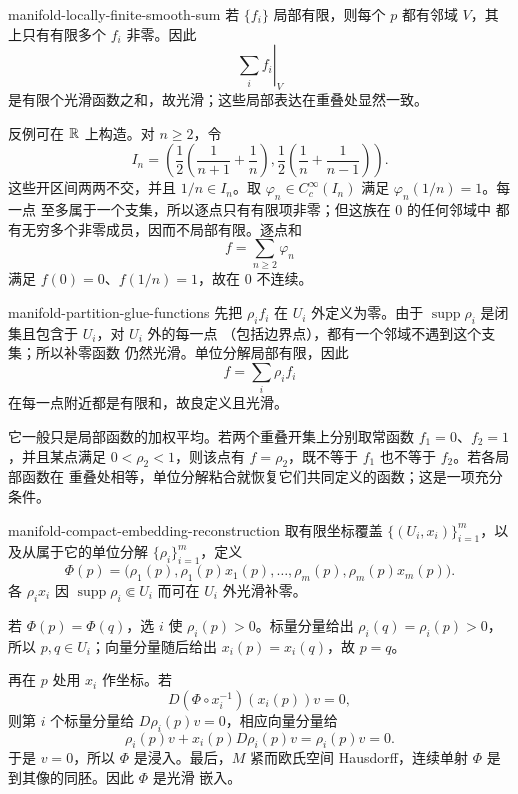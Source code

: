 \begin{solution}{manifold-locally-finite-smooth-sum}
若 \(\{f_i\}\) 局部有限，则每个 \(p\) 都有邻域 \(V\)，其上只有有限多个
\(f_i\) 非零。因此
\[
 \left.\sum_i f_i\right|_V
\]
是有限个光滑函数之和，故光滑；这些局部表达在重叠处显然一致。

反例可在 \(\mathbb{R}\) 上构造。对 \(n\ge2\)，令
\[
 I_n=
 \left(
 \frac12\left(\frac1{n+1}+\frac1n\right),
 \frac12\left(\frac1n+\frac1{n-1}\right)
 \right).
\]
这些开区间两两不交，并且 \(1/n\in I_n\)。取
\(\varphi_n\in C_c^\infty(I_n)\) 满足 \(\varphi_n(1/n)=1\)。每一点
至多属于一个支集，所以逐点只有有限项非零；但这族在 \(0\) 的任何邻域中
都有无穷多个非零成员，因而不局部有限。逐点和
\[
 f=\sum_{n\ge2}\varphi_n
\]
满足 \(f(0)=0\)、\(f(1/n)=1\)，故在 \(0\) 不连续。
\end{solution}

\begin{solution}{manifold-partition-glue-functions}
先把 \(\rho_i f_i\) 在 \(U_i\) 外定义为零。由于
\(\operatorname{supp}\rho_i\) 是闭集且包含于 $U_i$，对 $U_i$ 外的每一点
（包括边界点），都有一个邻域不遇到这个支集；所以补零函数
仍然光滑。单位分解局部有限，因此
\[
 f=\sum_i\rho_i f_i
\]
在每一点附近都是有限和，故良定义且光滑。

它一般只是局部函数的加权平均。若两个重叠开集上分别取常函数
\(f_1=0\)、\(f_2=1\)，并且某点满足 \(0<\rho_2<1\)，则该点有
\(f=\rho_2\)，既不等于 \(f_1\) 也不等于 \(f_2\)。若各局部函数在
重叠处相等，单位分解粘合就恢复它们共同定义的函数；这是一项充分条件。
\end{solution}

\begin{solution}{manifold-compact-embedding-reconstruction}
取有限坐标覆盖 \(\{(U_i,x_i)\}_{i=1}^m\)，以及从属于它的单位分解
\(\{\rho_i\}_{i=1}^m\)，定义
\[
 \Phi(p)=
 \bigl(\rho_1(p),\rho_1(p)x_1(p),\ldots,
       \rho_m(p),\rho_m(p)x_m(p)\bigr).
\]
各 \(\rho_i x_i\) 因 \(\operatorname{supp}\rho_i\Subset U_i\) 而可在
\(U_i\) 外光滑补零。

若 \(\Phi(p)=\Phi(q)\)，选 \(i\) 使 \(\rho_i(p)>0\)。标量分量给出
\(\rho_i(q)=\rho_i(p)>0\)，所以 \(p,q\in U_i\)；向量分量随后给出
\(x_i(p)=x_i(q)\)，故 \(p=q\)。

再在 \(p\) 处用 \(x_i\) 作坐标。若
\[
 D(\Phi\circ x_i^{-1})(x_i(p))v=0,
\]
则第 \(i\) 个标量分量给 \(D\rho_i(p)v=0\)，相应向量分量给
\[
 \rho_i(p)v+x_i(p)D\rho_i(p)v=\rho_i(p)v=0.
\]
于是 \(v=0\)，所以 \(\Phi\) 是浸入。最后，\(M\) 紧而欧氏空间
Hausdorff，连续单射 \(\Phi\) 是到其像的同胚。因此 \(\Phi\) 是光滑
嵌入。
\end{solution}
